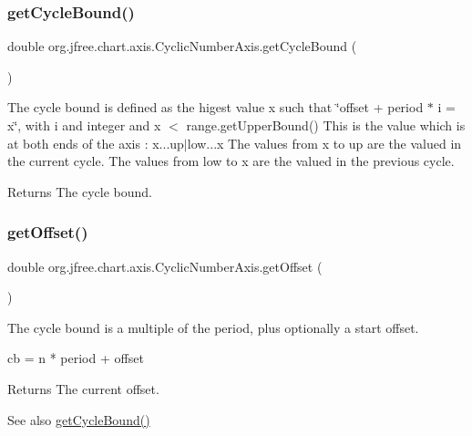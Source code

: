 \subsubsection{\texorpdfstring{get\+Cycle\+Bound()}{getCycleBound()}}
{\footnotesize\ttfamily double org.\+jfree.\+chart.\+axis.\+Cyclic\+Number\+Axis.\+get\+Cycle\+Bound (\begin{DoxyParamCaption}{ }\end{DoxyParamCaption})}

The cycle bound is defined as the higest value x such that \char`\"{}offset + period $\ast$ i = x\char`\"{}, with i and integer and x $<$ range.\+get\+Upper\+Bound() This is the value which is at both ends of the axis \+: x...up$\vert$low...x The values from x to up are the valued in the current cycle. The values from low to x are the valued in the previous cycle.

\begin{DoxyReturn}{Returns}
The cycle bound. 
\end{DoxyReturn}
\mbox{\label{classorg_1_1jfree_1_1chart_1_1axis_1_1_cyclic_number_axis_ad80e85bfb40953029ef0d3421c0e6eaf}} 
\subsubsection{\texorpdfstring{get\+Offset()}{getOffset()}}
{\footnotesize\ttfamily double org.\+jfree.\+chart.\+axis.\+Cyclic\+Number\+Axis.\+get\+Offset (\begin{DoxyParamCaption}{ }\end{DoxyParamCaption})}

The cycle bound is a multiple of the period, plus optionally a start offset. 
\begin{DoxyPre}cb = n * period + offset\end{DoxyPre}


\begin{DoxyReturn}{Returns}
The current offset.
\end{DoxyReturn}
\begin{DoxySeeAlso}{See also}
\mbox{\hyperlink{classorg_1_1jfree_1_1chart_1_1axis_1_1_cyclic_number_axis_af988de5e084906aebb81e7f12599d827}{get\+Cycle\+Bound()}} 
\end{DoxySeeAlso}
\mbox{\label{classorg_1_1jfree_1_1chart_1_1axis_1_1_cyclic_number_axis_a4cc6bdc62a9824b3fcf2b501b2d44387}} 
